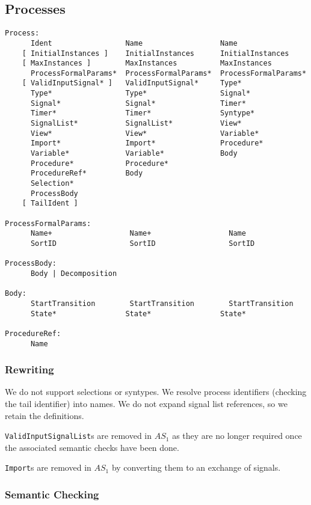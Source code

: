 \subsection{Processes}

\begin{verbatim}
Process:
      Ident                 Name                  Name
    [ InitialInstances ]    InitialInstances      InitialInstances
    [ MaxInstances ]        MaxInstances          MaxInstances
      ProcessFormalParams*  ProcessFormalParams*  ProcessFormalParams*
    [ ValidInputSignal* ]   ValidInputSignal*     Type*
      Type*                 Type*                 Signal*
      Signal*               Signal*               Timer*
      Timer*                Timer*                Syntype*
      SignalList*           SignalList*           View*
      View*                 View*                 Variable*
      Import*               Import*               Procedure*
      Variable*             Variable*             Body
      Procedure*            Procedure*
      ProcedureRef*         Body
      Selection*
      ProcessBody
    [ TailIdent ]

ProcessFormalParams:
      Name+                  Name+                  Name
      SortID                 SortID                 SortID

ProcessBody:
      Body | Decomposition

Body:
      StartTransition        StartTransition        StartTransition
      State*                State*                State*           

ProcedureRef:
      Name
\end{verbatim}

\subsubsection{Rewriting}

We do not support selections or syntypes.
We resolve process
identifiers (checking the tail identifier) into names. 
We do not
expand signal list references, so we retain the definitions.

{\tt ValidInputSignalList}s are removed in $AS_1$ as they are no
longer required once the associated semantic checks have been done.

{\tt Import}s are removed in $AS_1$ by converting them to 
an exchange of signals.

\subsubsection{Semantic Checking}
\label{inferroute}

